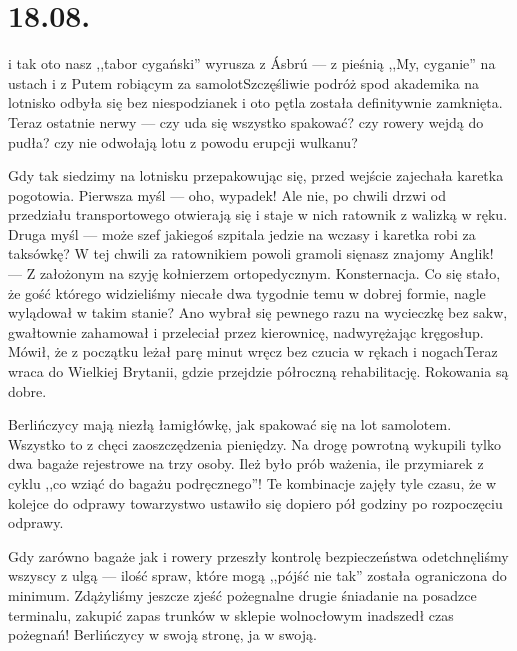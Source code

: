 \chapter*{18.08.}

\textellipsis i tak oto nasz ,,tabor cygański'' wyrusza z Ásbrú --- z pieśnią ,,My, cyganie'' na ustach i z Putem robiącym za samolot\textellipsis Szczęśliwie podróż spod akademika na lotnisko odbyła się bez niespodzianek i oto pętla została definitywnie zamknięta. Teraz ostatnie nerwy --- czy uda się wszystko spakować? czy rowery wejdą do pudła? czy nie odwołają lotu z powodu erupcji wulkanu?

Gdy tak siedzimy na lotnisku przepakowując się, przed wejście zajechała karetka pogotowia. Pierwsza myśl --- oho, wypadek! Ale nie, po chwili drzwi od przedziału transportowego otwierają się i staje w nich ratownik z walizką w ręku. Druga myśl --- może szef jakiegoś szpitala jedzie na wczasy i karetka robi za taksówkę? W tej chwili za ratownikiem powoli gramoli się\textellipsis nasz znajomy Anglik! --- Z założonym na szyję kołnierzem ortopedycznym. Konsternacja. Co się stało, że gość którego widzieliśmy niecałe dwa tygodnie temu w dobrej formie, nagle wylądował w takim stanie? Ano wybrał się pewnego razu na wycieczkę bez sakw, gwałtownie zahamował i przeleciał przez kierownicę, nadwyrężając kręgosłup. Mówił, że z początku leżał parę minut wręcz bez czucia w rękach i nogach\textellipsis Teraz wraca do Wielkiej Brytanii, gdzie przejdzie półroczną rehabilitację. Rokowania są dobre.

Berlińczycy mają niezłą łamigłówkę, jak spakować się na lot samolotem. Wszystko to z chęci zaoszczędzenia pieniędzy. Na drogę powrotną wykupili tylko dwa bagaże rejestrowe na trzy osoby. Ileż było prób ważenia, ile przymiarek z cyklu ,,co wziąć do bagażu podręcznego''! Te kombinacje zajęły tyle czasu, że w  kolejce do odprawy towarzystwo ustawiło się dopiero pół godziny po rozpoczęciu odprawy.


Gdy zarówno bagaże jak i rowery przeszły kontrolę bezpieczeństwa odetchnęliśmy wszyscy z ulgą --- ilość spraw, które mogą ,,pójść nie tak'' została ograniczona do minimum. Zdążyliśmy jeszcze zjeść pożegnalne drugie śniadanie na posadzce terminalu, zakupić zapas trunków w sklepie wolnocłowym i\textellipsis nadszedł czas pożegnań! Berlińczycy w swoją stronę, ja w swoją.

